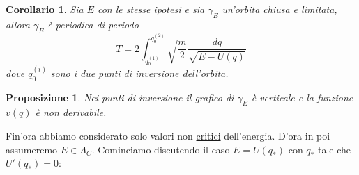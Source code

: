 \documentclass{book}
\theoremstyle{plain}
\theoremstyle{plain}
\theoremstyle{plain}
\theoremstyle{plain}
\newtheorem*{cor}{Corollario}
\theoremstyle{plain}
\newtheorem{prop}{Proposizione}[chapter]
\theoremstyle{definition}
\theoremstyle{remark}
\theoremstyle{definition}
\begin{document}
\begin{cor}
    Sia $E$ con le stesse ipotesi e sia $\gamma_E$ un'orbita chiusa e limitata, allora $\gamma_E$ è periodica di periodo
    \begin{displaymath}
        T=2\int_{q_0^{(1)}}^{q_0^{(2)}}\sqrt{\frac{m}{2}}\frac{dq}{\sqrt{E-U(q)}}
    \end{displaymath}
    dove ${q_0^{(i)}}$ sono i due punti di inversione dell'orbita.
\end{cor}

\begin{prop}
    Nei punti di inversione il grafico di $\gamma_E$ è verticale e la funzione $v(q)$ è non derivabile.
\end{prop}

\noindent Fin'ora abbiamo considerato solo valori non \underline{critici} dell'energia. D'ora in poi assumeremo $E\in\Lambda_C$. Cominciamo discutendo il caso $E=U(q_*)$ con $q_*$ tale che $U'(q_*)=0$:
\end{document}
